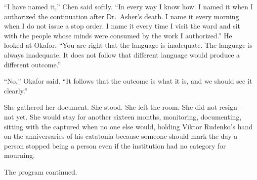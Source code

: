 ``I have named it,'' Chen said softly. ``In every way I know how. I named it when I authorized the continuation after Dr.\ Asher's death. I name it every morning when I do not issue a stop order. I name it every time I visit the ward and sit with the people whose minds were consumed by the work I authorized.'' He looked at Okafor. ``You are right that the language is inadequate. The language is always inadequate. It does not follow that different language would produce a different outcome.''

``No,'' Okafor said. ``It follows that the outcome is what it is, and we should see it clearly.''

She gathered her document. She stood. She left the room. She did not resign---not yet. She would stay for another sixteen months, monitoring, documenting, sitting with the captured when no one else would, holding Viktor Rudenko's hand on the anniversaries of his catatonia because someone should mark the day a person stopped being a person even if the institution had no category for mourning.

The program continued.

